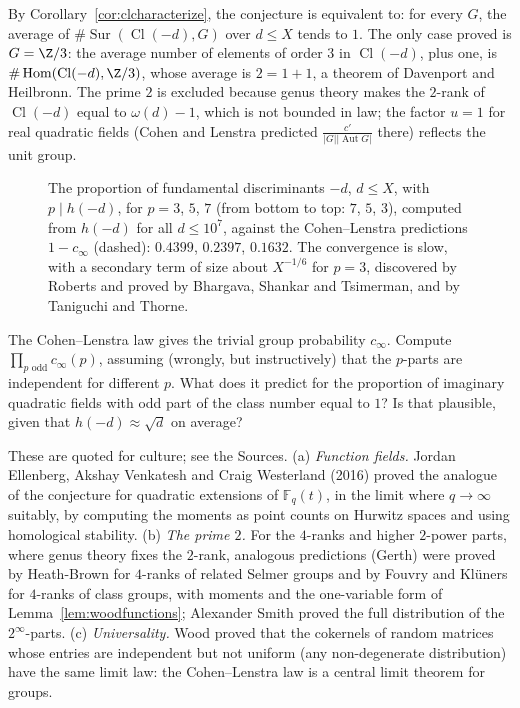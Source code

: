 By Corollary~\ref{cor:clcharacterize}, the conjecture is equivalent to: for every $G$, the average of $\#\operatorname{Sur}(\operatorname{Cl}(-d),G)$ over $d\le X$ tends to $1$. The only case proved is $G=\Z/3$: the average number of elements of order $3$ in $\operatorname{Cl}(-d)$, plus one, is $\#\operatorname{Hom}(\operatorname{Cl}(-d),\Z/3)$, whose average is $2=1+1$, a theorem of Davenport and Heilbronn. The prime $2$ is excluded because genus theory makes the $2$-rank of $\operatorname{Cl}(-d)$ equal to $\omega(d)-1$, which is not bounded in law; the factor $u=1$ for real quadratic fields (Cohen and Lenstra predicted $\frac{c'}{|G||\operatorname{Aut}G|}$ there) reflects the unit group.

\begin{figure}[ht]
\centering{}
\caption{The proportion of fundamental discriminants $-d$, $d\le X$, with $p\mid h(-d)$, for $p=3$, $5$, $7$ (from bottom to top: $7$, $5$, $3$), computed from $h(-d)$ for all $d\le10^7$, against the Cohen--Lenstra predictions $1-c_\infty$ (dashed): $0.4399$, $0.2397$, $0.1632$. The convergence is slow, with a secondary term of size about $X^{-1/6}$ for $p=3$, discovered by Roberts and proved by Bhargava, Shankar and Tsimerman, and by Taniguchi and Thorne.}
\label{fig:classnumbers}
\end{figure}

\begin{think}
The Cohen--Lenstra law gives the trivial group probability $c_\infty$. Compute $\prod_{p\text{ odd}}c_\infty(p)$, assuming (wrongly, but instructively) that the $p$-parts are independent for different $p$. What does it predict for the proportion of imaginary quadratic fields with odd part of the class number equal to $1$? Is that plausible, given that $h(-d)\approx\sqrt d$ on average?
\end{think}

\begin{remark}
These are quoted for culture; see the Sources. (a) \emph{Function fields.} Jordan Ellenberg, Akshay Venkatesh and Craig Westerland (2016) proved the analogue of the conjecture for quadratic extensions of $\mathbb F_q(t)$, in the limit where $q\to\infty$ suitably, by computing the moments as point counts on Hurwitz spaces and using homological stability. (b) \emph{The prime $2$.} For the $4$-ranks and higher $2$-power parts, where genus theory fixes the $2$-rank, analogous predictions (Gerth) were proved by Heath-Brown for $4$-ranks of related Selmer groups and by Fouvry and Klüners for $4$-ranks of class groups, with moments and the one-variable form of Lemma~\ref{lem:woodfunctions}; Alexander Smith proved the full distribution of the $2^\infty$-parts. (c) \emph{Universality.} Wood proved that the cokernels of random matrices whose entries are independent but not uniform (any non-degenerate distribution) have the same limit law: the Cohen--Lenstra law is a central limit theorem for groups.
\end{remark}

